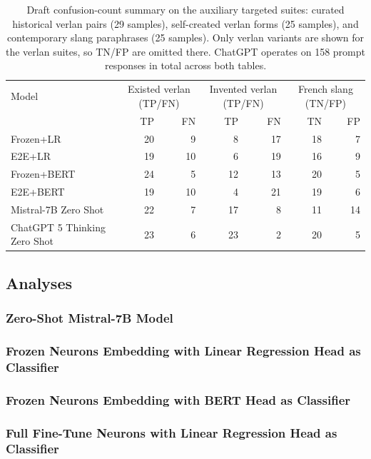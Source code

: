 \documentclass[12pt]{article}
\begin{document}
\begin{table}[H]
    \centering
    \footnotesize
    \begin{tabular}{lrrrrrr}
        \hline
        Model & \multicolumn{2}{c}{Existed verlan (TP/FN)} & \multicolumn{2}{c}{Invented verlan (TP/FN)} & \multicolumn{2}{c}{French slang (TN/FP)} \\
         & TP & FN & TP & FN & TN & FP \\
        \hline
        Frozen+LR & 20 & 9 & 8 & 17 & 18 & 7 \\
        E2E+LR & 19 & 10 & 6 & 19 & 16 & 9 \\
        Frozen+BERT & 24 & 5 & 12 & 13 & 20 & 5 \\
        E2E+BERT & 19 & 10 & 4 & 21 & 19 & 6 \\
        Mistral-7B Zero Shot & 22 & 7 & 17 & 8 & 11 & 14 \\
        ChatGPT 5 Thinking Zero Shot & 23 & 6 & 23 & 2 & 20 & 5 \\
        \hline
    \end{tabular}
    \caption{Draft confusion-count summary on the auxiliary targeted suites: curated historical verlan pairs (29 samples), self-created verlan forms (25 samples), and contemporary slang paraphrases (25 samples).  Only verlan variants are shown for the verlan suites, so TN/FP are omitted there.  ChatGPT operates on 158 prompt responses in total across both tables.}
    \label{tab:aux-test-confusion-draft}
\end{table}

\subsection{Analyses}
\subsubsection{Zero-Shot Mistral-7B Model}
\subsubsection{Frozen Neurons Embedding with Linear Regression Head as Classifier}
\subsubsection{Frozen Neurons Embedding with BERT Head as Classifier}
\subsubsection{Full Fine-Tune Neurons with Linear Regression Head as Classifier}
\end{document}
